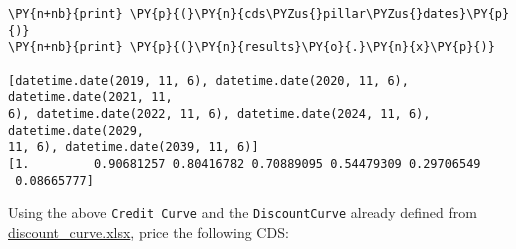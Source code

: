 \begin{Answer}
\begin{tcolorbox}[breakable, size=fbox, boxrule=1pt, pad at break*=1mm,colback=cellbackground, colframe=cellborder]
\begin{Verbatim}[commandchars=\\\{\}]
\PY{n+nb}{print} \PY{p}{(}\PY{n}{cds\PYZus{}pillar\PYZus{}dates}\PY{p}{)}
\PY{n+nb}{print} \PY{p}{(}\PY{n}{results}\PY{o}{.}\PY{n}{x}\PY{p}{)}

[datetime.date(2019, 11, 6), datetime.date(2020, 11, 6), datetime.date(2021, 11,
6), datetime.date(2022, 11, 6), datetime.date(2024, 11, 6), datetime.date(2029,
11, 6), datetime.date(2039, 11, 6)]
[1.         0.90681257 0.80416782 0.70889095 0.54479309 0.29706549
 0.08665777]
    \end{Verbatim}  
\end{tcolorbox}
\end{Answer}

\begin{Exercise}
Using the above \texttt{Credit\ Curve} and the \texttt{DiscountCurve} already defined from \href{https://drive.google.com/file/d/14R22r7m-6VpQ_P79D3qHdK0QN_mOQ_UB/view?usp=sharing}{discount\_curve.xlsx}, price the following CDS:


\end{Exercise}
